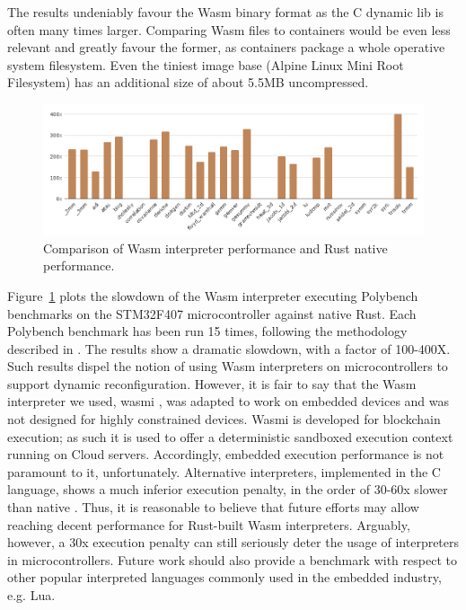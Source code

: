 The results undeniably favour the Wasm binary format as the C dynamic lib is often many times larger. Comparing Wasm files to containers would be even less relevant and greatly favour the former, as containers package a whole operative system filesystem. Even the tiniest image base (Alpine Linux Mini Root Filesystem) has an additional size of about 5.5MB uncompressed.

\begin{figure}[ht]
\centering
\includegraphics[width=\columnwidth]{figures/b-wasmi-4}
\caption{Comparison of Wasm interpreter performance and Rust native performance.} \label{fig:b-wasmi-4}
\end{figure}

Figure~\ref{fig:b-wasmi-4} plots the slowdown of the Wasm interpreter executing Polybench benchmarks on the STM32F407 microcontroller against native Rust. 
Each Polybench benchmark has been run 15 times, following the methodology described in \cite{wasm3-performance}. The results show a dramatic slowdown, with a factor of 100-400X. Such results dispel the notion of using Wasm interpreters on microcontrollers to support dynamic reconfiguration.
However, it is fair to say that the Wasm interpreter we used, wasmi \cite{wasmi}, was adapted to work on embedded devices and was not designed for highly constrained devices. 
Wasmi is developed for blockchain execution; as such it is used to offer a deterministic sandboxed execution context running on Cloud servers. Accordingly, embedded execution performance is not paramount to it, unfortunately. Alternative interpreters, implemented in the C language, shows a much inferior  execution penalty, in the order of 30-60x slower than native \cite{peach2020ewasm}. Thus, it is reasonable to believe that future efforts may allow reaching decent performance for Rust-built Wasm interpreters. Arguably, however, a 30x execution penalty can still seriously deter the usage of interpreters in microcontrollers. Future work should also provide a benchmark with respect to other popular interpreted languages commonly used in the embedded industry, e.g. Lua.

